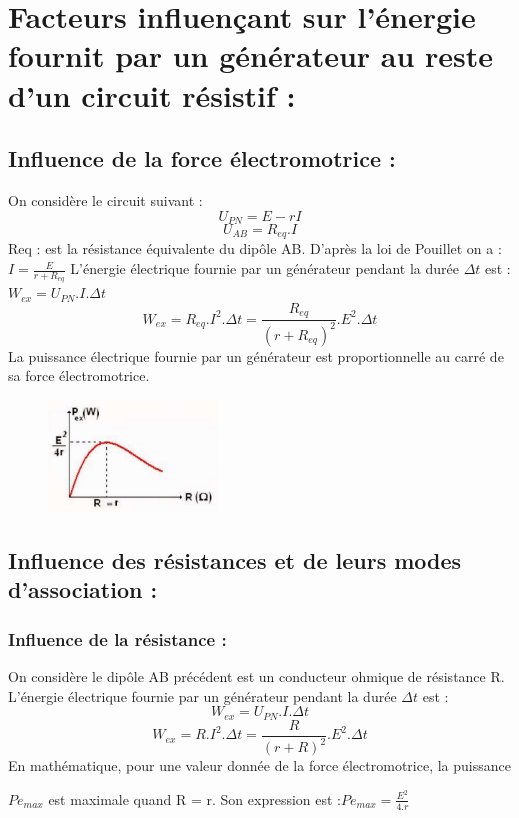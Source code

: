 \documentclass[12pt]{article}
\begin{document}
\section{Facteurs influençant sur l’énergie fournit par un générateur au reste d’un circuit résistif :}
\subsection{Influence de la force électromotrice : }
On considère le circuit suivant : 
$$U_{PN} = E - rI$$
$$U_{AB} = R_{eq}. I$$
Req : est la résistance équivalente du
dipôle AB.
D’après la loi de Pouillet on a : $I =\frac{E}{r + R_{eq}}$
L’énergie électrique fournie par un générateur pendant la durée $\Delta{t}$ est : $W_{ex} = U_{PN}.I. \Delta{t}$
$$W_{ex} = R_{eq}.I^2.\Delta{t} = \frac{R_{eq}}{(r + R_{eq})^2}.E^2.\Delta{t}$$
La puissance électrique fournie par un générateur est proportionnelle au carré de sa
force électromotrice.

\begin{figure}
    \includegraphics[width=0.4\textwidth]{./img/Influence _Resistance.png}
\end{figure}


\subsection{Influence des résistances et de leurs modes d’association : }

\subsubsection{Influence de la résistance : }
On considère le dipôle AB précédent est un conducteur ohmique de résistance R.
L’énergie électrique fournie par un
générateur pendant la durée $\Delta{t}$ est :
$$W_{ex} = U_{PN}. I. \Delta{t}$$
$$W_{ex} = R.I^2.\Delta{t} = \frac{R}{(r + R)^2} .E^2.\Delta{t}$$
En mathématique, pour une valeur donnée
de la force électromotrice, la puissance 

$Pe_{max}$ est maximale quand R = r. Son expression est :$Pe_{max} = \frac{E^2}{4.r}$
\end{document}
